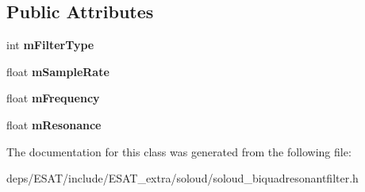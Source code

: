 \subsection*{Public Attributes}
\begin{DoxyCompactItemize}
\item 
\mbox{\label{class_so_loud_1_1_biquad_resonant_filter_a50e3f094f703e4c2780dc935d34ee3b7}} 
int {\bfseries m\+Filter\+Type}
\item 
\mbox{\label{class_so_loud_1_1_biquad_resonant_filter_af4172c10d05c58af54299a0bc586b706}} 
float {\bfseries m\+Sample\+Rate}
\item 
\mbox{\label{class_so_loud_1_1_biquad_resonant_filter_a4a87bf863804bb3a9cd0a09cc0db00b3}} 
float {\bfseries m\+Frequency}
\item 
\mbox{\label{class_so_loud_1_1_biquad_resonant_filter_a06f7f1c568237c23b9d05fd7695d3a63}} 
float {\bfseries m\+Resonance}
\end{DoxyCompactItemize}


The documentation for this class was generated from the following file\+:\begin{DoxyCompactItemize}
\item 
deps/\+E\+S\+A\+T/include/\+E\+S\+A\+T\+\_\+extra/soloud/soloud\+\_\+biquadresonantfilter.\+h\end{DoxyCompactItemize}
